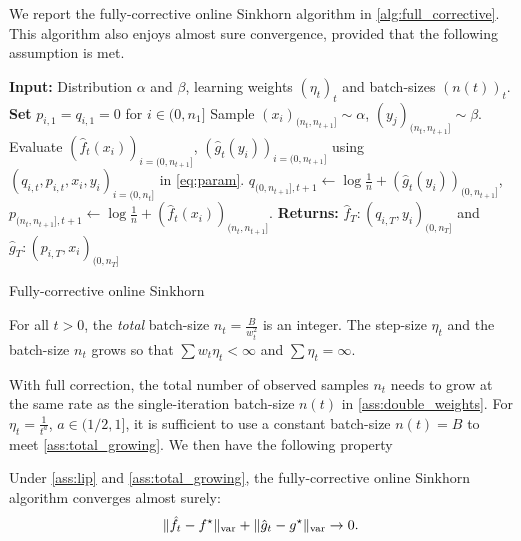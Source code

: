 We report the fully-corrective online Sinkhorn algorithm in \autoref{alg:full_corrective}. This algorithm also enjoys almost sure convergence, provided that the following assumption is met.

\begin{algorithm}[t]
    \begin{algorithmic}
    \State \textbf{Input:} Distribution $\alpha$ and $\beta$, learning weights ${(\eta_t)}_t$ and batch-sizes ${(n(t))}_t$. 
    \textbf{Set} $p_{i,1} = q_{i,1} = 0$ for $i \in (0, n_1]$
        \State Sample $(x_i)_{(n_t, n_{t+1}]} \sim \alpha$, $(y_j)_{(n_t, n_{t+1}]} \sim \beta$.
            \State Evaluate $(\hat f_t(x_i))_{i=(0, n_{t+1}]}$,
             $(\hat g_t(y_i))_{i=(0, n_{t+1}]}$ using $(q_{i,t}, p_{i,t}, x_i, y_i)_{i=(0,n_{t}]}$ in \eqref{eq:param}.
             \State $q_{(0, n_{t+1}],t+1} {\gets} \log \frac{1}{n}
             + (\hat g_t(y_i))_{(0, n_{t+1}]}$,
             \qquad $p_{(n_t, n_{t+1}],t+1} {\gets} \log \frac{1}{n} 
             + (\hat f_t(x_i))_{(n_t, n_{t+1}]}$.
    \EndFor
    \State \textbf{Returns:} $\hat f_T : (q_{i,T}, y_i)_{(0, n_T]}$ and
    $\hat g_T : (p_{i,T}, x_i)_{(0, n_T]}$
    \end{algorithmic}
    \vspace{-.4em}
    \caption{Fully-corrective online Sinkhorn}\label{alg:full_corrective}
\end{algorithm}

\begin{assumption}\label{ass:total_growing}
    For all $t > 0$, the \textit{total} batch-size $n_t = \frac{B}{w_t^2}$ is an
        integer. The step-size $\eta_t$ and the batch-size $n_t$ grows so that
        $\sum w_t \eta_t < \infty$ and $\sum \eta_t = \infty$.
\end{assumption}

With full correction, the total number of observed samples $n_t$ needs to grow
at the same rate as the single-iteration batch-size $n(t)$ in
\autoref{ass:double_weights}. For $\eta_t = \frac{1}{t^a}$, $a \in (1/2, 1]$, it
is sufficient to use a constant batch-size $n(t) = B$ to meet \autoref{ass:total_growing}. We then have the following property

\begin{proposition}
    Under \autoref{ass:lip} and
    \ref{ass:total_growing}, the fully-corrective online Sinkhorn algorithm converges almost surely:
    \begin{equation}
        \Vert \hat f_t - f^\star \Vert_{\text{\upshape var}} + \Vert \hat g_t - g^\star \Vert_{\text{\upshape var}} \to 0.
    \end{equation}
\end{proposition}


